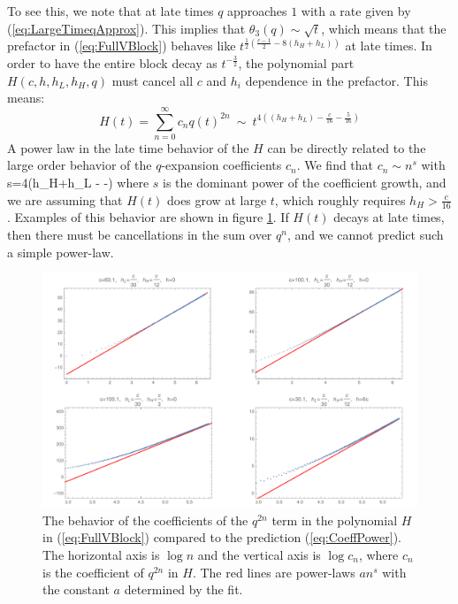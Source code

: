 To see this, we note that at late times $q$ approaches $1$ with a rate given by (\ref{eq:LargeTimeqApprox}). This implies that $\theta_{3}(q)\sim\sqrt{t}$, which means that the prefactor in (\ref{eq:FullVBlock}) behaves like  $t^{\frac{1}{2}\left(\frac{c-1}{2}-8(h_{H}+h_{L})\right)}$ at late times. In order to have the entire block decay as $t^{-\frac{3}{2}}$, the polynomial part $H\left(c,h,h_L, h_H ,q\right)$ must  cancel all $c$ and $h_i$ dependence in the prefactor. This means: 
\begin{equation}
H(t)={\displaystyle \sum_{n=0}^{\infty}}c_{n}q(t)^{2n} \ \sim \ t^{4\left((h_{H}+h_{L})-\frac{c}{16}-\frac{5}{16}\right)}\label{eq:PowerSum}
\end{equation}
A power law in the late time behavior of the $H$ can be directly related to the large order behavior of the $q$-expansion coefficients $c_n$.  We find that $c_{n} \sim n^{s}$ with 
\be
\label{eq:CoeffPower}
s=4\left(h_{H}+h_{L} - -\right)
\ee
where $s$ is the dominant power of the coefficient growth, and we are assuming that $H(t)$ does grow at large $t$, which roughly requires $h_H > \frac{c}{16}$. Examples of this behavior are shown in figure \ref{fig:Coeffpower}.  
 If $H(t)$ decays at late times, then there must be cancellations in the sum over $q^n$, and we cannot predict such a simple power-law.

\begin{figure}[H]
\centering{}\includegraphics[scale=0.5]{virasoro_chapter/Coeffpower}\caption{The behavior of the coefficients of the $q^{2n}$ term in the polynomial $H$ in (\ref{eq:FullVBlock}) compared to the prediction (\ref{eq:CoeffPower}). The horizontal axis is $\log n$ and the vertical axis is $\log c_{n}$, where $c_n$ is the coefficient of $q^{2n}$ in $H$. The red lines are power-laws $a n^s$ with the constant $a$ determined by the fit. \label{fig:Coeffpower}}
\end{figure}

